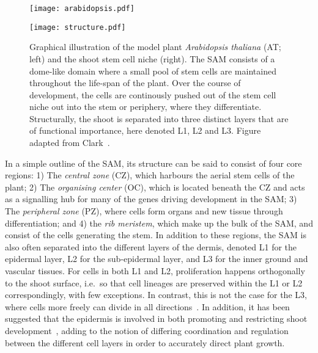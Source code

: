 \begin{figure}[H]
  \centering
  \begin{minipage}{0.25\textwidth}
    \centering
    \texttt{[image: arabidopsis.pdf]}
  \end{minipage}\hfill
  \begin{minipage}{.75\textwidth}
    \centering
    \texttt{[image: structure.pdf]} %
  \end{minipage}
  \caption[Graphical illustration of model organism]{
    Graphical illustration of
    the model plant \textit{Arabidopsis thaliana} (AT; left) 
    and the shoot stem cell niche
    (right). The SAM consists of a dome-like domain where a small pool of stem
    cells are maintained  
    throughout the life-span of the plant. Over the course of development,
    the cells are continously pushed out of the stem cell niche out into the
    stem or periphery, where they differentiate. Structurally, the shoot is
    separated into three distinct layers that are of functional
    importance, here denoted L1, L2 and L3. Figure adapted from
    Clark~\cite{clark2001cell}.}
  \label{fig:structure}
\end{figure}

In a simple outline of the SAM, its structure can be said to consist of four core regions:
1) The \textit{central zone} (CZ), which harbours the aerial stem cells
of the plant; 2) The \textit{organising center} (OC), which is located beneath
the CZ and acts as a signalling hub for many of the genes driving development in
the SAM; 3) The
\textit{peripheral zone} (PZ), where cells form organs and new tissue through
differentiation; and 4) the \textit{rib meristem}, which make up the bulk of the
SAM, and consist of the cells generating the stem. In addition to these regions,
the SAM is also often separated 
into the different layers of the dermis, denoted L1 for the epidermal
layer, L2 for the sub-epidermal layer, and L3 for the inner ground
and vascular tissues. For cells in both L1 and L2, proliferation happens
orthogonally to the shoot surface, i.e.\ so that cell lineages are preserved
within the L1 or L2 correspondingly, with few exceptions. In contrast,
this is not the case for the L3, where 
cells more freely can divide in all directions~\cite{scheres2007stem}. In
addition, it has been suggested
that the epidermis is involved in both promoting and restricting shoot
development~\cite{gruel2016epidermis}, adding to the
notion of differing coordination and regulation between the different cell layers in order
to accurately direct plant growth. 

